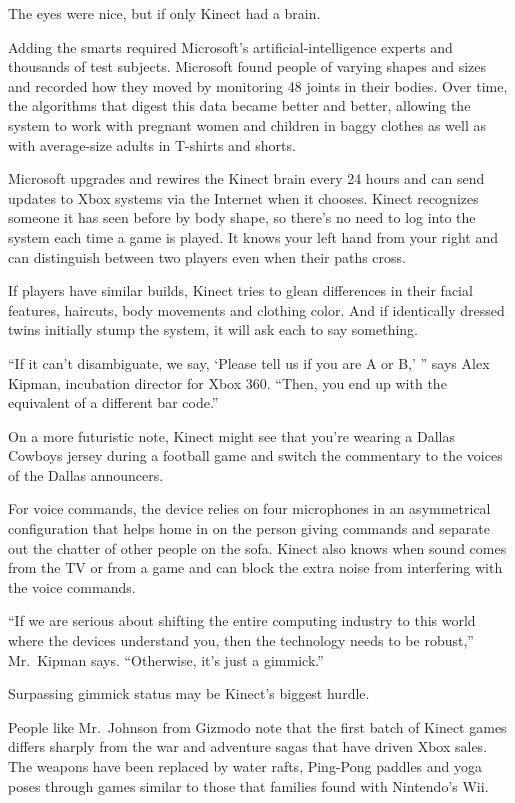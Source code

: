 ﻿\documentclass[12pt]{article}
\begin{document}
The eyes were nice, but if only Kinect had a brain.

Adding the smarts required Microsoft's artificial-intelligence experts and thousands of test
subjects. Microsoft found people of varying shapes and sizes and recorded how they moved by
monitoring 48 joints in their bodies. Over time, the algorithms that digest this data became better
and better, allowing the system to work with pregnant women and children in baggy clothes as well as
with average-size adults in T-shirts and shorts.

Microsoft upgrades and rewires the Kinect brain every 24 hours and can send updates to Xbox systems
via the Internet when it chooses. Kinect recognizes someone it has seen before by body shape, so
there's no need to log into the system each time a game is played. It knows your left hand from your
right and can distinguish between two players even when their paths cross.

If players have similar builds, Kinect tries to glean differences in their facial features,
haircuts, body movements and clothing color. And if identically dressed twins initially stump the
system, it will ask each to say something.

``If it can't disambiguate, we say, `Please tell us if you are A or B,' '' says Alex Kipman,
incubation director for Xbox 360. ``Then, you end up with the equivalent of a different bar code.''

On a more futuristic note, Kinect might see that you're wearing a Dallas Cowboys jersey during a
football game and switch the commentary to the voices of the Dallas announcers.

For voice commands, the device relies on four microphones in an asymmetrical configuration that
helps home in on the person giving commands and separate out the chatter of other people on the
sofa. Kinect also knows when sound comes from the TV or from a game and can block the extra noise
from interfering with the voice commands.

``If we are serious about shifting the entire computing industry to this world where the devices
understand you, then the technology needs to be robust,'' Mr.~Kipman says. ``Otherwise, it's just a
gimmick.''

Surpassing gimmick status may be Kinect's biggest hurdle.

People like Mr.~Johnson from Gizmodo note that the first batch of Kinect games differs sharply from
the war and adventure sagas that have driven Xbox sales. The weapons have been replaced by water
rafts, Ping-Pong paddles and yoga poses through games similar to those that families found with
Nintendo's Wii.
\end{document}
